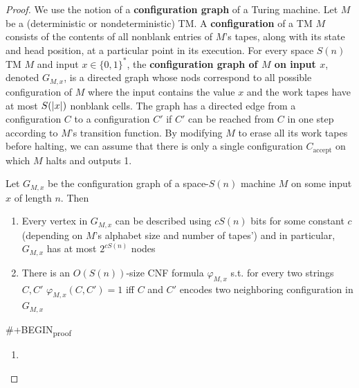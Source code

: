 \documentclass[11pt]{article}
\def \accept {\text{accept}}
\begin{document}
\begin{proof}
We use the notion of a \textbf{configuration graph} of a Turing machine. Let \(M\) be a (deterministic or
nondeterministic) TM. A \textbf{configuration} of a TM \(M\) consists of the contents of all nonblank
entries of \(M\)'s tapes, along with its state and head position, at a particular point in its
execution. For every space \(S(n)\) TM \(M\) and input \(x\in\{0,1\}^*\), the
\textbf{configuration graph of \(M\) on input \(x\)}, denoted \(G_{M,x}\), is a directed graph whose nods
correspond to all possible configuration of \(M\) where the input contains the value \(x\) and
the work tapes have at most \(S(\abs{x})\) nonblank cells. The graph has a directed edge from a
configuration \(C\) to a configuration \(C'\) if \(C'\) can be reached from \(C\) in one step
according to \(M\)'s transition function. By modifying \(M\) to erase all its work tapes before
halting, we can assume that there is only a single configuration \(C_{\accept}\) on which \(M\)
halts and outputs 1.

\begin{claim}
Let \(G_{M,x}\) be the configuration graph of a space-\(S(n)\) machine \(M\) on some
 input \(x\) of length \(n\). Then
\begin{enumerate}
\item Every vertex in \(G_{M,x}\) can be described using \(cS(n)\) bits for some constant \(c\)
(depending on \(M\)'s alphabet size and number of tapes') and in particular, \(G_{M,x}\) has
at most \(2^{cS(n)}\) nodes
\item There is an \(O(S(n))\)-size CNF formula \(\varphi_{M,x}\) s.t. for every two
strings \(C,C'\) \(\varphi_{M,x}(C,C')=1\) iff \(C\) and \(C'\) encodes two neighboring
configuration in \(G_{M,x}\)
\end{enumerate}
\end{claim}

\#+BEGIN\textsubscript{proof}
\begin{enumerate}
\item 
\end{enumerate}
\end{proof}
\end{document}
